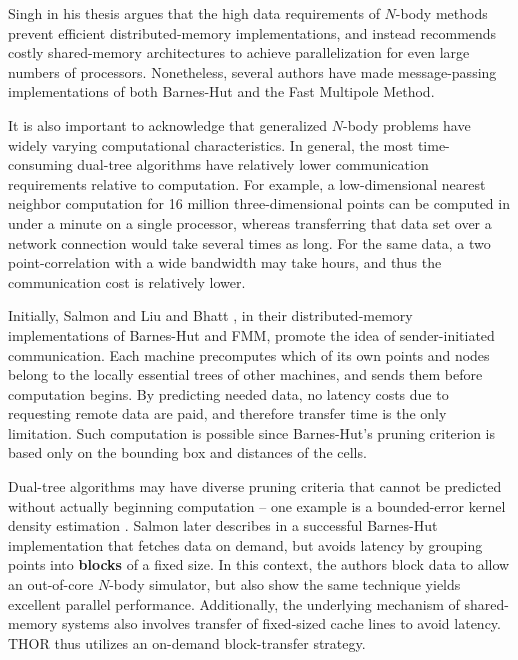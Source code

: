 \documentclass[twoside,leqno,twocolumn]{article}
\newcommand{\defterm}[1]{{\bf #1}}
\begin{document}
Singh in his thesis \cite{singh_thesis} argues that the high data requirements of $N$-body methods prevent efficient distributed-memory implementations, and instead recommends costly shared-memory architectures to achieve parallelization for even large numbers of processors.
Nonetheless, several authors \cite{salmon_thesis, liu94experiences, salmon97parallel} have made message-passing implementations of both Barnes-Hut and the Fast Multipole Method.

It is also important to acknowledge that generalized $N$-body problems have widely varying computational characteristics.
In general, the most time-consuming dual-tree algorithms have relatively lower communication requirements relative to computation.
For example, a low-dimensional nearest neighbor computation for 16 million three-dimensional points can be computed in under a minute on a single processor, whereas transferring that data set over a network connection would take several times as long.
For the same data, a two point-correlation with a wide bandwidth may take hours, and thus the communication cost is relatively lower.

Initially, Salmon \cite{salmon_thesis} and Liu and Bhatt \cite{liu94experiences}, in their distributed-memory implementations of Barnes-Hut and FMM, promote the idea of sender-initiated communication.
Each machine precomputes which of its own points and nodes belong to the locally essential trees of other machines, and sends them before computation begins.
By predicting needed data, no latency costs due to requesting remote data are paid, and therefore transfer time is the only limitation.
Such computation is possible since Barnes-Hut's pruning criterion is based only on the bounding box and distances of the cells.

Dual-tree algorithms may have diverse pruning criteria that cannot be predicted without actually beginning computation -- one example is a bounded-error kernel density estimation \cite{gray_kde}.
Salmon later describes in \cite{salmon97parallel} a successful Barnes-Hut implementation that fetches data on demand, but avoids latency by grouping points into \defterm{blocks} of a fixed size.
In this context, the authors block data to allow an out-of-core $N$-body simulator, but also show the same technique yields excellent parallel performance.
Additionally, the underlying mechanism of shared-memory systems also involves transfer of fixed-sized cache lines to avoid latency.
THOR thus utilizes an on-demand block-transfer strategy.
\end{document}
